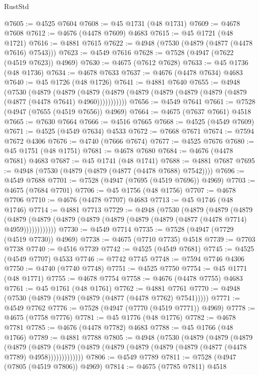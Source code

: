 \begin{lexlean}{RustStd}
\begin{coremodule}
@7605 := @4525 @7604
@7608 := @45 @1731 (@48 @1731)
@7609 := @4678 @7608
@7612 := @4676 (@4478 @7609) @4683
@7615 := @45 @1721 (@48 @1721)
@7616 := @4881 @7615
@7622 := @4948 (@7530 (@4879 (@4877 (@4478 @7616) @7543)))
@7623 := @4549 @7616
@7628 := @7528 (@4947 (@7622 (@4519 @7623)) @4969)
@7630 := @4675 (@7612 @7628)
@7633 := @45 @1736 (@48 @1736)
@7634 := @4678 @7633
@7637 := @4676 (@4478 @7634) @4683
@7640 := @45 @1726 (@48 @1726)
@7641 := @4881 @7640
@7655 := @4948
    (@7530
      (@4879
        (@4879
          (@4879 (@4879 (@4879 (@4879 (@4879 (@4879 (@4879 (@4877 (@4478 @7641) @4960)))))))))))
@7656 := @4549 @7641
@7661 := @7528 (@4947 (@7655 (@4519 @7656)) @4969)
@7664 := @4675 (@7637 @7661) @4518
@7665 := @7630 @7664
@7666 := @4516 @7665
@7668 := @4525 (@4549 @7609)
@7671 := @4525 (@4549 @7634) @4533
@7672 := @7668 @7671
@7674 := @7594 @7672 @4306
@7676 := @4740 (@7666 @7674)
@7677 := @4525 @7676
@7680 := @45 @1751 (@48 @1751)
@7681 := @4678 @7680
@7684 := @4676 (@4478 @7681) @4683
@7687 := @45 @1741 (@48 @1741)
@7688 := @4881 @7687
@7695 := @4948 (@7530 (@4879 (@4879 (@4877 (@4478 @7688) @7542))))
@7696 := @4549 @7688
@7701 := @7528 (@4947 (@7695 (@4519 @7696)) @4969)
@7703 := @4675 (@7684 @7701)
@7706 := @45 @1756 (@48 @1756)
@7707 := @4678 @7706
@7710 := @4676 (@4478 @7707) @4683
@7713 := @45 @1746 (@48 @1746)
@7714 := @4881 @7713
@7729 := @4948
    (@7530
      (@4879
        (@4879
          (@4879
            (@4879 (@4879 (@4879 (@4879 (@4879 (@4879 (@4879 (@4877 (@4478 @7714) @4959))))))))))))
@7730 := @4549 @7714
@7735 := @7528 (@4947 (@7729 (@4519 @7730)) @4969)
@7738 := @4675 (@7710 @7735) @4518
@7739 := @7703 @7738
@7740 := @4516 @7739
@7742 := @4525 (@4549 @7681)
@7745 := @4525 (@4549 @7707) @4533
@7746 := @7742 @7745
@7748 := @7594 @7746 @4306
@7750 := @4740 (@7740 @7748)
@7751 := @4525 @7750
@7754 := @45 @1771 (@48 @1771)
@7755 := @4678 @7754
@7758 := @4676 (@4478 @7755) @4683
@7761 := @45 @1761 (@48 @1761)
@7762 := @4881 @7761
@7770 := @4948 (@7530 (@4879 (@4879 (@4879 (@4877 (@4478 @7762) @7541)))))
@7771 := @4549 @7762
@7776 := @7528 (@4947 (@7770 (@4519 @7771)) @4969)
@7778 := @4675 (@7758 @7776)
@7781 := @45 @1776 (@48 @1776)
@7782 := @4678 @7781
@7785 := @4676 (@4478 @7782) @4683
@7788 := @45 @1766 (@48 @1766)
@7789 := @4881 @7788
@7805 := @4948
    (@7530
      (@4879
        (@4879
          (@4879
            (@4879
              (@4879
                (@4879 (@4879 (@4879 (@4879 (@4879 (@4879 (@4877 (@4478 @7789) @4958)))))))))))))
@7806 := @4549 @7789
@7811 := @7528 (@4947 (@7805 (@4519 @7806)) @4969)
@7814 := @4675 (@7785 @7811) @4518

\end{coremodule}
\end{lexlean}
